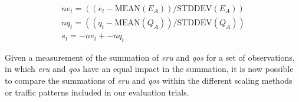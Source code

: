\begin{align*}
  ne_{t} = ((e_{t} - \mbox{MEAN}(E_{A})) / \mbox{STDDEV}(E_{A})) \\
  nq_{t} = ((q_{t} - \mbox{MEAN}(Q_{A})) / \mbox{STDDEV}(Q_{A})) \\
  s_{t} = -ne_{t} + -nq_{t}
\end{align*}

Given a measurement of the summation of \textit{eru} and \textit{qos} for a set
of observations, in which \textit{eru} and \textit{qos} have an equal impact in
the summation, it is now possible to compare the summations of \textit{eru} and
\textit{qos} within the different scaling methods or traffic patterns included
in our evaluation trials.
